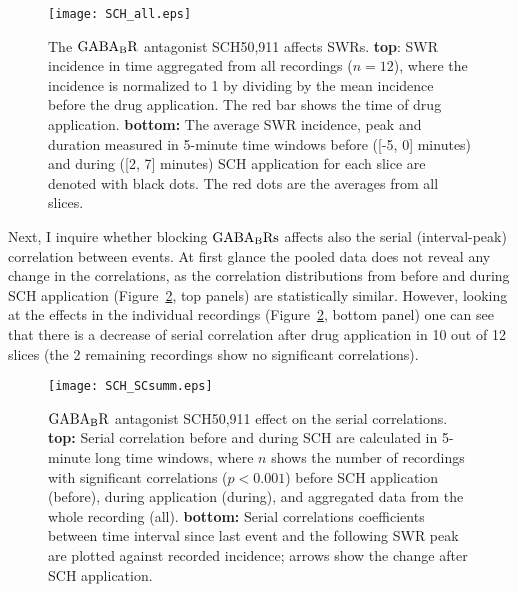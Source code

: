     \begin{figure}
      \center
      \texttt{[image: SCH\_all.eps]}
      \caption{
        The $\rm GABA_BR$ antagonist SCH50,911 affects SWRs. {\bf top}:
        SWR incidence in time aggregated from all recordings ($n=12$), where the
        incidence is normalized to 1 by dividing by the mean incidence before
        the drug application. The red bar shows the time of drug application.
        {\bf bottom:} The average SWR incidence, peak and duration measured in
        5-minute time windows before ([-5, 0] minutes) and during ([2, 7]
        minutes) SCH application for each slice are denoted with black dots.
        The red dots are the averages from all slices.
            }
    \label{gB_summ}
    \end{figure}

    Next, I inquire whether blocking $\rm GABA_B Rs$ affects also the serial
    (interval-peak) correlation between events. At first glance the pooled data
    does not reveal any change in the correlations, as the correlation
    distributions from before and during SCH application
    (Figure~\ref{gB_SCsumm}, top panels) are statistically similar. However,
    looking at the effects in the individual recordings
    (Figure~\ref{gB_SCsumm}, bottom panel) one can see that there is a decrease
    of serial correlation after drug application in 10 out of 12 slices (the 2
    remaining recordings show no significant correlations).

    \begin{figure}
      \center
      \texttt{[image: SCH\_SCsumm.eps]}
      \caption{
        $\rm GABA_BR$ antagonist SCH50,911 effect on the serial
        correlations. \textbf{top:} Serial correlation before and during
        SCH are calculated in 5-minute long time windows, where $n$ shows
        the number of recordings with significant correlations ($p<0.001$)
        before SCH application (before), during application (during), and
        aggregated data from the whole recording (all). \textbf{bottom:} Serial
        correlations coefficients between time interval since last event and
        the following SWR peak are plotted against recorded incidence; arrows
        show the change after SCH application.
            }
    \label{gB_SCsumm}
    \end{figure}

